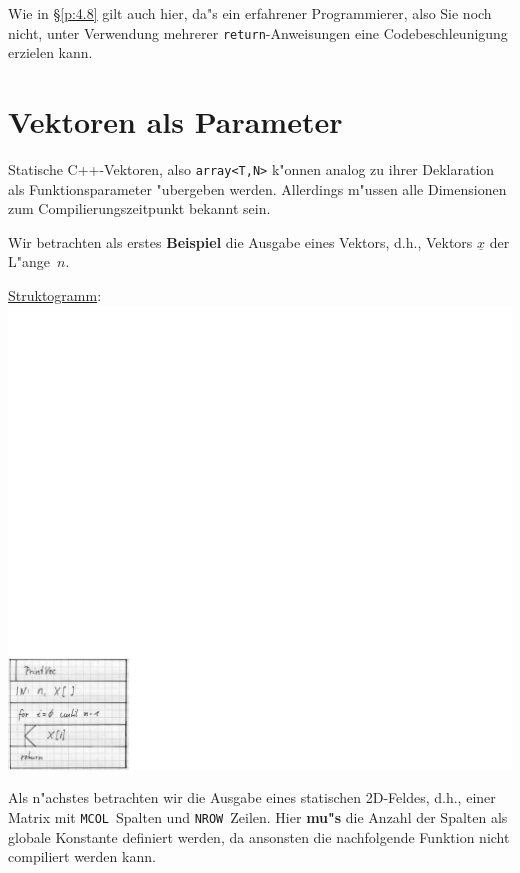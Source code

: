 Wie in \S\ref{p:4.8} gilt auch hier, da"s ein erfahrener Programmierer, 
also Sie noch nicht, 
unter Verwendung mehrerer \verb|return|-Anweisungen
eine Codebeschleunigung erzielen kann.
%
%
\section{Vektoren als Parameter}
\label{p:7.4}
%
%
Statische C++-Vektoren, also \texttt{array<T,N>}  k"onnen analog zu ihrer Deklaration als Funktionsparameter
"ubergeben werden. Allerdings m"ussen alle Dimensionen zum Compilierungszeitpunkt bekannt sein.

Wir betrachten als erstes \textbf{Beispiel} die Ausgabe eines
Vektors,
d.h., Vektors $\underline{x}$ der L"ange~$n$.
%

\underline{Struktogramm}: \\
\includegraphics[scale=0.7]{GIF/p71}
%
%

Als n"achstes betrachten wir die Ausgabe eines statischen 2D-Feldes,
d.h., einer Matrix mit \verb|MCOL|~Spalten und \verb|NROW|~Zeilen.
Hier \textbf{mu"s} die Anzahl der Spalten als globale Konstante definiert
werden, da ansonsten die nachfolgende Funktion nicht compiliert werden kann.
%
%

